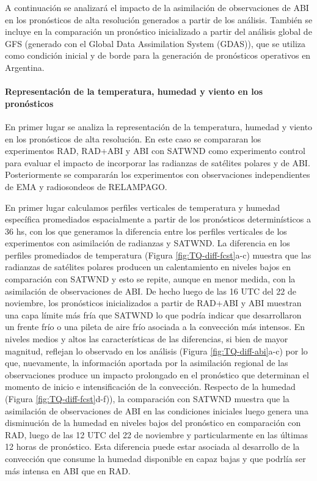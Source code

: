 \documentclass[12pt,oneside,a4paper]{reedthesis}
\begin{document}
A continuación se analizará el impacto de la asimilación de observaciones de ABI en los pronósticos de alta resolución generados a partir de los análisis. También se incluye en la comparación un pronóstico inicializado a partir del análisis global de GFS (generado con el Global Data Assimilation System (GDAS)), que se utiliza como condición inicial y de borde para la generación de pronósticos operativos en Argentina.

\hypertarget{representaciuxf3n-de-la-temperatura-humedad-y-viento-en-los-pronuxf3sticos}{%
\paragraph{Representación de la temperatura, humedad y viento en los pronósticos}\label{representaciuxf3n-de-la-temperatura-humedad-y-viento-en-los-pronuxf3sticos}}

En primer lugar se analiza la representación de la temperatura, humedad y viento en los pronósticos de alta resolución. En este caso se compararan los experimentos RAD, RAD+ABI y ABI con SATWND como experimento control para evaluar el impacto de incorporar las radianzas de satélites polares y de ABI. Posteriormente se compararán los experimentos con observaciones independientes de EMA y radiosondeos de RELAMPAGO.

En primer lugar calculamos perfiles verticales de temperatura y humedad específica promediados espacialmente a partir de los pronósticos determinísticos a 36 hs, con los que generamos la diferencia entre los perfiles verticales de los experimentos con asimilación de radianzas y SATWND. La diferencia en los perfiles promediados de temperatura (Figura \ref{fig:TQ-diff-fcst}a-c) muestra que las radianzas de satélites polares producen un calentamiento en niveles bajos en comparación con SATWND y esto se repite, aunque en menor medida, con la asimilación de observaciones de ABI. De hecho luego de las 16 UTC del 22 de noviembre, los pronósticos inicializados a partir de RAD+ABI y ABI muestran una capa límite más fría que SATWND lo que podría indicar que desarrollaron un frente frío o una pileta de aire frío asociada a la convección más intensos. En niveles medios y altos las características de las diferencias, si bien de mayor magnitud, reflejan lo observado en los análisis (Figura \ref{fig:TQ-diff-abi}a-c) por lo que, nuevamente, la información aportada por la asimilación regional de las observaciones produce un impacto prolongado en el pronóstico que determinan el momento de inicio e intensificación de la convección. Respecto de la humedad (Figura \ref{fig:TQ-diff-fcst}d-f)), la comparación con SATWND muestra que la asimilación de observaciones de ABI en las condiciones iniciales luego genera una disminución de la humedad en niveles bajos del pronóstico en comparación con RAD, luego de las 12 UTC del 22 de noviembre y particularmente en las últimas 12 horas de pronóstico. Esta diferencia puede estar asociada al desarrollo de la convección que consume la humedad disponible en capaz bajas y que podrlía ser más intensa en ABI que en RAD.
\end{document}
